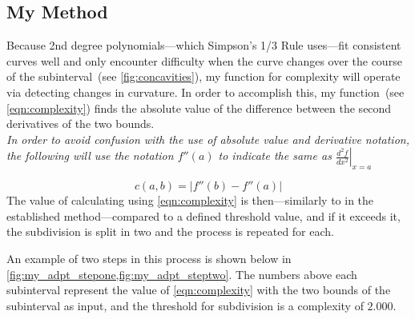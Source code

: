 \documentclass{paper}
\begin{document}
\subsection{My Method}
\label{sec:my_method}
Because 2nd degree polynomials---which Simpson's 1/3 Rule uses---fit consistent curves well and only encounter difficulty when the curve changes over the course of the subinterval~(see \cref{fig:concavities}), my function for complexity will operate via detecting changes in curvature.
In order to accomplish this, my function~(see \cref{eqn:complexity}) finds the absolute value of the difference between the second derivatives of the two bounds.\\
\emph{In order to avoid confusion with the use of absolute value and derivative notation, the following will use the notation \(f''(a)\) to indicate the same as \(\left.\frac{d^2f}{dx^2}\right|_{x=a}\)}
%

%
\begin{equation}
    \label{eqn:complexity}
    c(a, b) = \left|f''(b) - f''(a)\right|
\end{equation}
%
The value of calculating using \cref{eqn:complexity} is then---similarly to in the established method---compared to a defined threshold value, and if it exceeds it, the subdivision is split in two and the process is repeated for each.

An example of two steps in this process is shown below in \cref{fig:my_adpt_stepone,fig:my_adpt_steptwo}.
The numbers above each subinterval represent the value of \cref{eqn:complexity} with the two bounds of the subinterval as input, and the threshold for subdivision is a complexity of \(2.000\).
%


\end{document}
